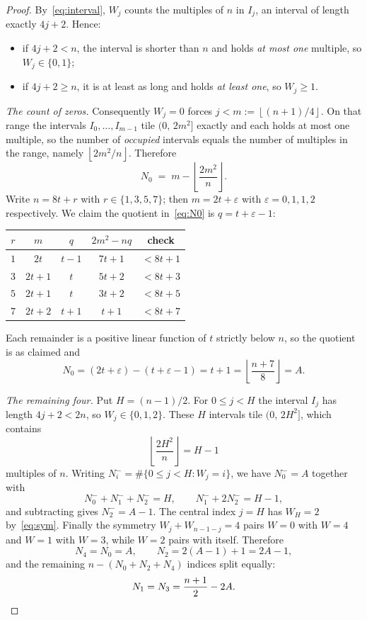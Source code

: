 \documentclass[11pt,reqno]{amsart}
\theoremstyle{plain}
\theoremstyle{remark}
\numberwithin{equation}{section}
\newcommand{\fl}[1]{\left\lfloor #1 \right\rfloor}
\begin{document}
\begin{proof}
By~\eqref{eq:interval}, $W_j$ counts the multiples of $n$ in $I_j$, an interval
of length exactly $4j+2$. Hence:
\begin{itemize}
  \item if $4j+2 < n$, the interval is shorter than $n$ and holds
        \emph{at most one} multiple, so $W_j \in \{0,1\}$;
  \item if $4j+2 \ge n$, it is at least as long and holds
        \emph{at least one}, so $W_j \ge 1$.
\end{itemize}

\emph{The count of zeros.} Consequently $W_j = 0$ forces $j < m := \fl{(n+1)/4}$.
On that range the intervals $I_0,\dots,I_{m-1}$ tile $(0,\,2m^2]$ exactly and
each holds at most one multiple, so the number of \emph{occupied} intervals
equals the number of multiples in the range, namely $\fl{2m^2/n}$. Therefore
\begin{equation}\label{eq:N0}
  N_0 \;=\; m - \fl{\frac{2m^2}{n}} .
\end{equation}
Write $n = 8t+r$ with $r \in \{1,3,5,7\}$; then $m = 2t+\varepsilon$ with
$\varepsilon = 0,1,1,2$ respectively. We claim the quotient in~\eqref{eq:N0} is
$q = t+\varepsilon-1$:

\begin{table}[h]
\centering
\begin{tabular}{c c c c c}
\toprule
$r$ & $m$ & $q$ & $2m^2-nq$ & check \\
\midrule
$1$ & $2t$   & $t-1$ & $7t+1$ & $< 8t+1$ \\
$3$ & $2t+1$ & $t$   & $5t+2$ & $< 8t+3$ \\
$5$ & $2t+1$ & $t$   & $3t+2$ & $< 8t+5$ \\
$7$ & $2t+2$ & $t+1$ & $t+1$  & $< 8t+7$ \\
\bottomrule
\end{tabular}
\end{table}

Each remainder is a positive linear function of $t$ strictly below $n$, so the
quotient is as claimed and
\begin{equation}\label{eq:A}
  N_0 = (2t+\varepsilon)-(t+\varepsilon-1) = t+1 = \fl{\frac{n+7}{8}} = A .
\end{equation}

\emph{The remaining four.} Put $H = (n-1)/2$. For $0 \le j < H$ the interval
$I_j$ has length $4j+2 < 2n$, so $W_j \in \{0,1,2\}$. These $H$ intervals tile
$(0,\,2H^2]$, which contains
\[
  \fl{\frac{2H^2}{n}} = H-1
\]
multiples of $n$. Writing $N_i^- = \#\{0 \le j < H : W_j = i\}$, we have
$N_0^- = A$ together with
\[
  N_0^- + N_1^- + N_2^- = H, \qquad N_1^- + 2N_2^- = H-1,
\]
and subtracting gives $N_2^- = A-1$. The central index $j = H$ has $W_H = 2$
by~\eqref{eq:sym}. Finally the symmetry $W_j + W_{n-1-j} = 4$ pairs $W{=}0$ with
$W{=}4$ and $W{=}1$ with $W{=}3$, while $W{=}2$ pairs with itself. Therefore
\[
  N_4 = N_0 = A, \qquad N_2 = 2(A-1)+1 = 2A-1,
\]
and the remaining $n - (N_0+N_2+N_4)$ indices split equally:
\[
  N_1 = N_3 = \frac{n+1}{2}-2A . \qedhere
\]
\end{proof}
\end{document}
